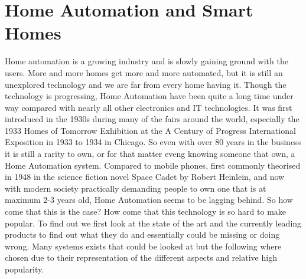 \section{Home Automation and Smart Homes}
Home automation is a growing industry and is slowly gaining ground with the users. More and more homes get more and more automated, but it is still an unexplored technology and we are far from every home having it. Though the technology is progressing, Home Automation have been quite a long time under way compared with nearly all other electronics and IT technologies. It was first introduced in the 1930s during many of the fairs around the world, especially the 1933 Homes of Tomorrow Exhibition at the A Century of Progress International Exposition in 1933 to 1934 in Chicago. So even with over 80 years in the business it is still a rarity to own, or for that matter eveng knowing someone that own, a Home Automation system. Compared to mobile phones, first commonly theorised in 1948 in the science fiction novel Space Cadet by Robert Heinlein, and now with modern society practically demanding people to own one that is at maximum 2-3 years old, Home Automation seems to be lagging behind. So how come that this is the case? How come that this technology is so hard to make popular. To find out we first look at the state of the art and the currently leading products to find out what they do and essentially could be missing or doing wrong. Many systems exists that could be looked at but the following where chosen due to their representation of the different aspects and relative high popularity.

